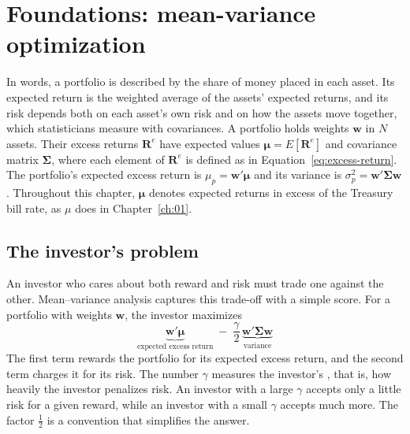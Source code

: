 \section{Foundations: mean-variance optimization}
\label{sec:12-foundations}

In words, a portfolio is described by the share of money placed in each asset. Its expected return is the weighted average of the assets' expected returns, and its risk depends both on each asset's own risk and on how the assets move together, which statisticians measure with covariances. A portfolio holds weights $\mathbf{w}$ in $N$ assets. Their excess returns $\mathbf{R}^{e}$ have expected values $\boldsymbol{\mu} = E[\mathbf{R}^{e}]$ and covariance matrix $\boldsymbol{\Sigma}$, where each element of $\mathbf{R}^{e}$ is defined as in Equation~\eqref{eq:excess-return}. The portfolio's expected excess return is $\mu_p = \mathbf{w}'\boldsymbol{\mu}$ and its variance is $\sigma_p^2 = \mathbf{w}'\boldsymbol{\Sigma}\mathbf{w}$. Throughout this chapter, $\boldsymbol{\mu}$ denotes expected returns in excess of the Treasury bill rate, as $\mu$ does in Chapter~\ref{ch:01}.

\subsection{The investor's problem}
\label{sec:12-problem}

An investor who cares about both reward and risk must trade one against the other. Mean--variance analysis captures this trade-off with a simple score. For a portfolio with weights $\mathbf{w}$, the investor maximizes
\begin{equation}
  \underbrace{\mathbf{w}'\boldsymbol{\mu}}_{\text{expected excess return}} \; - \; \frac{\gamma}{2}\,\underbrace{\mathbf{w}'\boldsymbol{\Sigma}\mathbf{w}}_{\text{variance}}
  \label{eq:12-mv-objective}
\end{equation}
The first term rewards the portfolio for its expected excess return, and the second term charges it for its risk. The number $\gamma$ measures the investor's , that is, how heavily the investor penalizes risk. An investor with a large $\gamma$ accepts only a little risk for a given reward, while an investor with a small $\gamma$ accepts much more. The factor $\tfrac{1}{2}$ is a convention that simplifies the answer.

